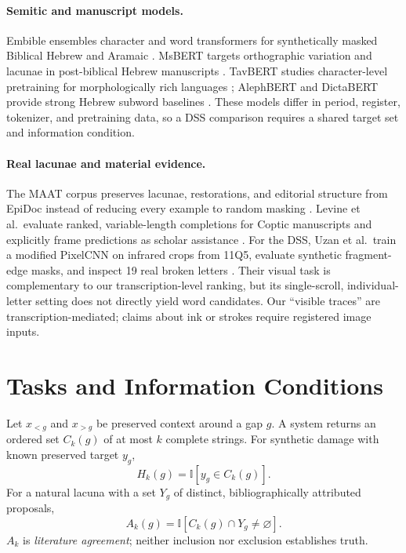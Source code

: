 \documentclass[10pt,twocolumn,a4paper]{article}
\begin{document}
\paragraph{Semitic and manuscript models.}
Embible ensembles character and word transformers for synthetically masked Biblical Hebrew and Aramaic \cite{fono2024}. MsBERT targets orthographic variation and lacunae in post-biblical Hebrew manuscripts \cite{shmidman2024}. TavBERT studies character-level pretraining for morphologically rich languages \cite{keren2022}; AlephBERT and DictaBERT provide strong Hebrew subword baselines \cite{seker2022,shmidman2023}. These models differ in period, register, tokenizer, and pretraining data, so a DSS comparison requires a shared target set and information condition.

\paragraph{Real lacunae and material evidence.}
The MAAT corpus preserves lacunae, restorations, and editorial structure from EpiDoc instead of reducing every example to random masking \cite{fitzgerald2024}. Levine et al.\ evaluate ranked, variable-length completions for Coptic manuscripts and explicitly frame predictions as scholar assistance \cite{levine2024}. For the DSS, Uzan et al.\ train a modified PixelCNN on infrared crops from 11Q5, evaluate synthetic fragment-edge masks, and inspect 19 real broken letters \cite{uzan2017}. Their visual task is complementary to our transcription-level ranking, but its single-scroll, individual-letter setting does not directly yield word candidates. Our ``visible traces'' are transcription-mediated; claims about ink or strokes require registered image inputs.

\section{Tasks and Information Conditions}

Let $x_{<g}$ and $x_{>g}$ be preserved context around a gap $g$. A system returns an ordered set $C_k(g)$ of at most $k$ complete strings. For synthetic damage with known preserved target $y_g$,
\begin{equation}
H_k(g)=\mathbb{I}[y_g\in C_k(g)].
\end{equation}
For a natural lacuna with a set $Y_g$ of distinct, bibliographically attributed proposals,
\begin{equation}
A_k(g)=\mathbb{I}[C_k(g)\cap Y_g\neq\varnothing].
\label{eq:agreement}
\end{equation}
$A_k$ is \emph{literature agreement}; neither inclusion nor exclusion establishes truth.
\end{document}

